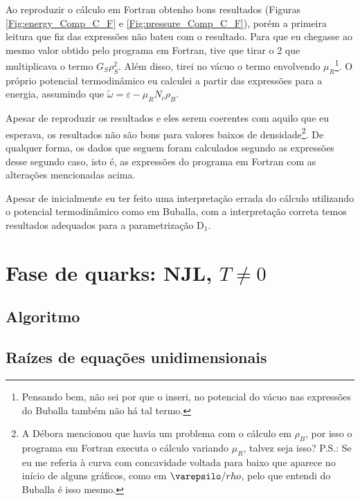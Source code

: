 Ao reproduzir o cálculo em Fortran obtenho bons resultados (Figuras \ref{Fig:energy_Comp_C_F} e \ref{Fig:pressure_Comp_C_F}), porém a primeira leitura que fiz das expressões não bateu com o resultado. Para que eu chegasse ao mesmo valor obtido pelo programa em Fortran, tive que tirar o 2 que multiplicava o termo $G_S \rho_S^2$. Além disso, tirei no vácuo o termo envolvendo $\mu_R$\footnote{Pensando bem, não sei por que o inseri, no potencial do vácuo nas expressões do Buballa também não há tal termo.}. O próprio potencial termodinâmico eu calculei a partir das expressões para a energia, assumindo que $\tilde{\omega} = \varepsilon - \mu_R N_c \rho_B$.
	
Apesar de reproduzir os resultados e eles serem coerentes com aquilo que eu esperava, os resultados não são bons para valores baixos de densidade\footnote{A Débora mencionou que havia um problema com o cálculo em $\rho_B$, por isso o programa em Fortran executa o cálculo variando $\mu_R$, talvez seja isso? P.S.: Se eu me referia à curva com concavidade voltada para baixo que aparece no início de alguns gráficos, como em $\varepsilo/rho$, pelo que entendi do Buballa é isso mesmo.}. De qualquer forma, os dados que seguem foram calculados segundo as expressões desse segundo caso, isto é, as expressões do programa em Fortran com as alterações mencionadas acima. 

Apesar de inicialmente eu ter feito uma interpretação errada do cálculo utilizando o potencial termodinâmico como em Buballa\cite{Buballa1996}, com a interpretação correta temos resultados adequados para a parametrização D$_1$.

\section{Fase de quarks: NJL, $T \neq 0$}

\subsection{Algoritmo}

\subsection{Raízes de equações unidimensionais}

